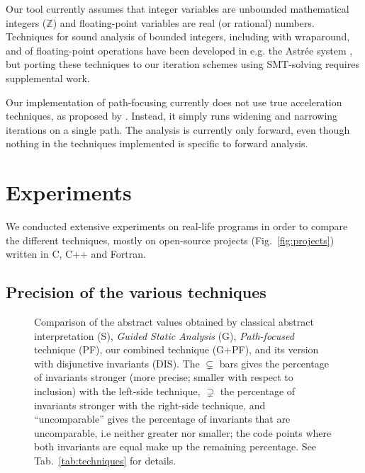 \documentclass{entcs}
\newcommand{\ZZ}{\mathbb{Z}}
\begin{document}
Our tool currently assumes that integer variables are unbounded mathematical integers ($\ZZ$) and floating-point variables are real (or rational) numbers. Techniques for sound analysis of bounded integers, including with wraparound, and of floating-point operations have been developed in e.g. the Astr\'ee system \citep{ASTREE_ESOP05,ASTREE_PLDI03}, but porting these techniques to our iteration schemes using SMT-solving requires supplemental work.

Our implementation of path-focusing currently does not use true acceleration
techniques, as proposed by \citet{Monniaux_Gonnord_SAS11}. Instead, it simply runs widening and narrowing iterations on a single path.
The analysis is currently only forward, even though nothing in the techniques
implemented is specific to forward analysis.

\section{Experiments}
\label{sec:experiments}

We conducted extensive experiments on real-life programs in order to compare the
different techniques, mostly on open-source projects (Fig.~\ref{fig:projects}) written in C, C++ and Fortran.

\subsection{Precision of the various techniques}
\label{sec:compare_techniques}

\begin{figure}[h]
  \begin{center}
    
  \end{center} 
  \vspace{-20pt}
  \caption{Comparison of the abstract values obtained by classical abstract
  interpretation (S), \emph{Guided Static
  Analysis} (G), \emph{Path-focused} technique (PF), our combined technique
  (G+PF), and its version with disjunctive invariants (DIS).
  The $\subsetneq$ bars gives the percentage of invariants stronger (more precise; smaller with respect to inclusion) with the left-side technique,
$\supsetneq$ the percentage of invariants stronger with the right-side technique,
and ``uncomparable'' gives the percentage of invariants that are uncomparable, i.e
neither greater nor smaller;
the code points where both invariants are equal make up the remaining percentage. See Tab.~\ref{tab:techniques} for details.}
  \label{fig:techniques}
\end {figure}
\end{document}
